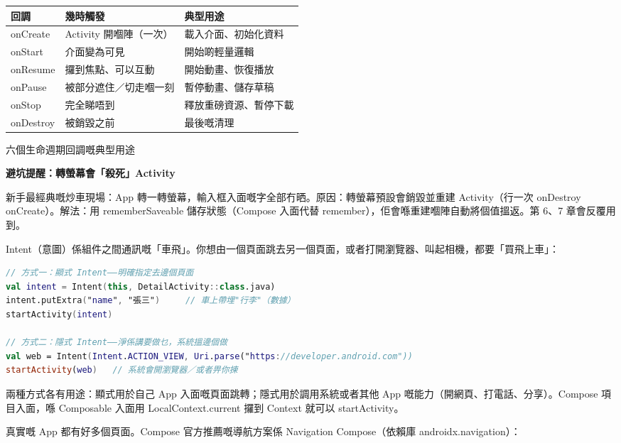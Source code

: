 \begin{center}
\begin{tabularx}{\linewidth}{|X|X|X|}
\hline
\textbf{回調} & \textbf{幾時觸發} & \textbf{典型用途} \tabularnewline
\hline
onCreate & Activity 開嗰陣（一次） & 載入介面、初始化資料 \tabularnewline
onStart & 介面變為可見 & 開始啲輕量邏輯 \tabularnewline
onResume & 攞到焦點、可以互動 & 開始動畫、恢復播放 \tabularnewline
onPause & 被部分遮住／切走嗰一刻 & 暫停動畫、儲存草稿 \tabularnewline
onStop & 完全睇唔到 & 釋放重磅資源、暫停下載 \tabularnewline
onDestroy & 被銷毀之前 & 最後嘅清理 \tabularnewline
\hline
\end{tabularx}
\end{center}

\begin{center}\small\color{gray}六個生命週期回調嘅典型用途\end{center}

\textbf{避坑提醒：轉螢幕會「殺死」Activity}\par

新手最經典嘅炒車現場：App 轉一轉螢幕，輸入框入面嘅字全部冇晒。原因：轉螢幕預設會銷毀並重建 Activity（行一次 onDestroy onCreate）。解法：用 rememberSaveable 儲存狀態（Compose 入面代替 remember），佢會喺重建嗰陣自動將個值搵返。第 6、7 章會反覆用到。


Intent（意圖）係組件之間通訊嘅「車飛」。你想由一個頁面跳去另一個頁面，或者打開瀏覽器、叫起相機，都要「買飛上車」：

\begin{lstlisting}[language=Kotlin]
// 方式一：顯式 Intent——明確指定去邊個頁面
val intent = Intent(this, DetailActivity::class.java)
intent.putExtra("name", "張三")     // 車上帶埋"行李"（數據）
startActivity(intent)

// 方式二：隱式 Intent——淨係講要做乜，系統搵邊個做
val web = Intent(Intent.ACTION_VIEW, Uri.parse("https://developer.android.com"))
startActivity(web)   // 系統會開瀏覽器／或者畀你揀
\end{lstlisting}

兩種方式各有用途：顯式用於自己 App 入面嘅頁面跳轉；隱式用於調用系統或者其他 App 嘅能力（開網頁、打電話、分享）。Compose 項目入面，喺 Composable 入面用 LocalContext.current 攞到 Context 就可以 startActivity。


真實嘅 App 都有好多個頁面。Compose 官方推薦嘅導航方案係 Navigation Compose（依賴庫 androidx.navigation）：

